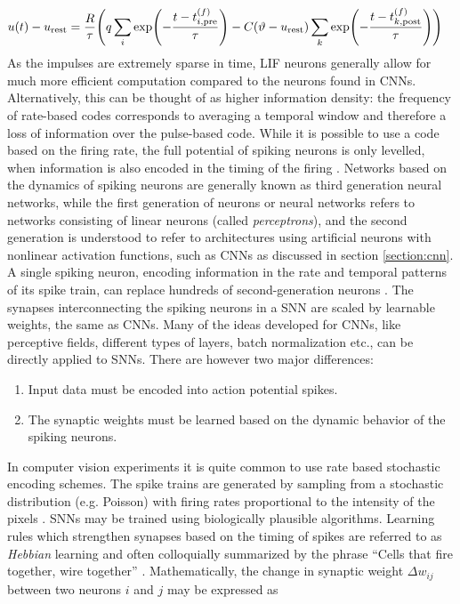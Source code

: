 \begin{align}
    u(t)-u_\mathrm{rest} &= \frac{R}{\tau}\qty(q \sum_i \exp(-\frac{t-t_{i,\mathrm{pre}}^{(f)}}{\tau})-C\qty(\vartheta-u_\mathrm{rest})\sum_k\exp(-\frac{t-t_{k,\mathrm{post}}^{(f)}}{\tau}))
\end{align}
As the impulses are extremely sparse in time, LIF neurons generally allow for much more efficient computation compared to the neurons found in CNNs. Alternatively, this can be thought of as higher information density: the frequency of rate-based codes corresponds to averaging a temporal window and therefore a loss of information over the pulse-based code. While it is possible to use a code based on the firing rate, the full potential of spiking neurons is only levelled, when information is also encoded in the timing of the firing \cite{bohte2002unsupervised,bohte2004evidence,hopfield1995pattern}. Networks based on the dynamics of spiking neurons are generally known as third generation neural networks, while the first generation of neurons or neural networks refers to networks consisting of linear neurons (called \emph{perceptrons}), and the second generation is understood to refer to architectures using artificial neurons with nonlinear activation functions, such as CNNs as discussed in section \ref{section:cnn}. A single spiking neuron, encoding information in the rate and temporal patterns of its spike train, can replace hundreds of second-generation neurons \cite{gerstner2002spiking,maass1997networks,rieke1999spikes}. The synapses interconnecting the spiking neurons in a SNN are scaled by learnable weights, the same as CNNs. Many of the ideas developed for CNNs, like perceptive fields, different types of layers, batch normalization etc., can be directly applied to SNNs. There are however two major differences:
\begin{enumerate}
    \item Input data must be encoded into action potential spikes.
    \item The synaptic weights must be learned based on the dynamic behavior of the spiking neurons.
\end{enumerate}
In computer vision experiments it is quite common to use rate based stochastic encoding schemes. The spike trains are generated by sampling from a stochastic distribution (e.g. Poisson) with firing rates proportional to the intensity of the pixels \cite{diehl2015unsupervised}. SNNs may be trained using biologically plausible algorithms. Learning rules which strengthen synapses based on the timing of spikes are referred to as \emph{Hebbian} learning and often colloquially summarized by the phrase \enquote{Cells that fire together, wire together} \cite{hebbs1949organization}. Mathematically, the change in synaptic weight $\Delta w_{ij}$ between two neurons $i$ and $j$ may be expressed as
